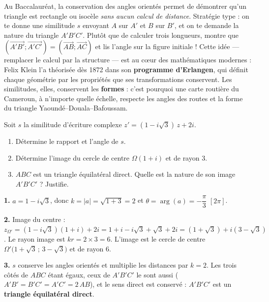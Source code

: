 \documentclass[11pt]{article}
\begin{document}
\begin{savaistu}
Au Baccalauréat, la conservation des angles orientés permet de démontrer qu'un triangle est rectangle ou isocèle \emph{sans aucun calcul de distance}. Stratégie type : on te donne une similitude $s$ envoyant $A$ sur $A'$ et $B$ sur $B'$, et on te demande la nature du triangle $A'B'C'$. Plutôt que de calculer trois longueurs, montre que $(\overrightarrow{A'B'};\overrightarrow{A'C'}) = (\overrightarrow{AB};\overrightarrow{AC})$ et lis l'angle sur la figure initiale ! Cette idée — remplacer le calcul par la structure — est au cœur des mathématiques modernes : Felix Klein l'a théorisée dès 1872 dans son \textbf{programme d'Erlangen}, qui définit chaque géométrie par les propriétés que ses transformations conservent. Les similitudes, elles, conservent les \textbf{formes} : c'est pourquoi une carte routière du Cameroun, à n'importe quelle échelle, respecte les angles des routes et la forme du triangle Yaoundé--Douala--Bafoussam.
\end{savaistu}

\begin{exercice}
Soit $s$ la similitude d'écriture complexe $z' = (1 - i\sqrt{3})\,z + 2i$.
\begin{enumerate}
\item Détermine le rapport et l'angle de $s$.
\item Détermine l'image du cercle de centre $\Omega(1 + i)$ et de rayon $3$.
\item $ABC$ est un triangle équilatéral direct. Quelle est la nature de son image $A'B'C'$ ? Justifie.
\end{enumerate}
\end{exercice}

\begin{corrige}[Exercice 1]
\textbf{1.} $a = 1 - i\sqrt{3}$, donc $k = |a| = \sqrt{1 + 3} = 2$ et $\theta = \operatorname{arg}(a) = -\dfrac{\pi}{3}$ $[2\pi]$.

\textbf{2.} Image du centre : $z_{\Omega'} = (1 - i\sqrt{3})(1+i) + 2i = 1 + i - i\sqrt{3} + \sqrt{3} + 2i = (1+\sqrt{3}) + i(3 - \sqrt{3})$. Le rayon image est $kr = 2 \times 3 = 6$. L'image est le cercle de centre $\Omega'\big(1+\sqrt{3}\,;\,3-\sqrt{3}\big)$ et de rayon $6$.

\textbf{3.} $s$ conserve les angles orientés et multiplie les distances par $k = 2$. Les trois côtés de $ABC$ étant égaux, ceux de $A'B'C'$ le sont aussi ($A'B' = B'C' = A'C' = 2\,AB$), et le sens direct est conservé : $A'B'C'$ est un \textbf{triangle équilatéral direct}.
\end{corrige}
\end{document}
